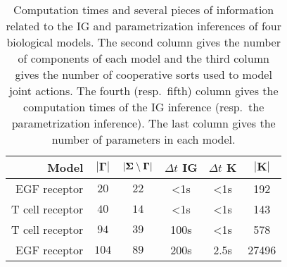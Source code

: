 \begin{table}[ht]
\begin{center}
  \begin{tabular}{r|c|c|c|c|c}
    \textbf{Model} & $\mathbf{|\Gamma|}$ & $\mathbf{|\Sigma \setminus \Gamma|}$ & \textbf{$\Delta t$ IG} & \textbf{$\Delta t$ K} & $\mathbf{|K|}$
\\\hline\hline
    EGF receptor \cite{Sahin09} & $20$ & $22$ & <1s & <1s & 192
\\\hline
    T cell receptor \cite{Klamt06} & $40$ & $14$ & <1s & <1s & 143
\\\hline
    T cell receptor \cite{SaezRodriguez2007} & $94$ & $39$ & 100s & <1s & 578
\\\hline
    EGF receptor \cite{Samaga2009} & $104$ & $89$ & 200s & 2.5s & 27496
  \end{tabular}
\end{center}
\caption{%
  Computation times and several pieces of information related to the IG and parametrization inferences of four biological models.
  The second column gives the number of components of each model and
  the third column gives the number of cooperative sorts used to model joint actions.
  The fourth (resp.~fifth) column gives the computation times of the IG inference (resp.~the parametrization inference).
  The last column gives the number of parameters in each model.
  }
\label{tb:computation}
\end{table}
